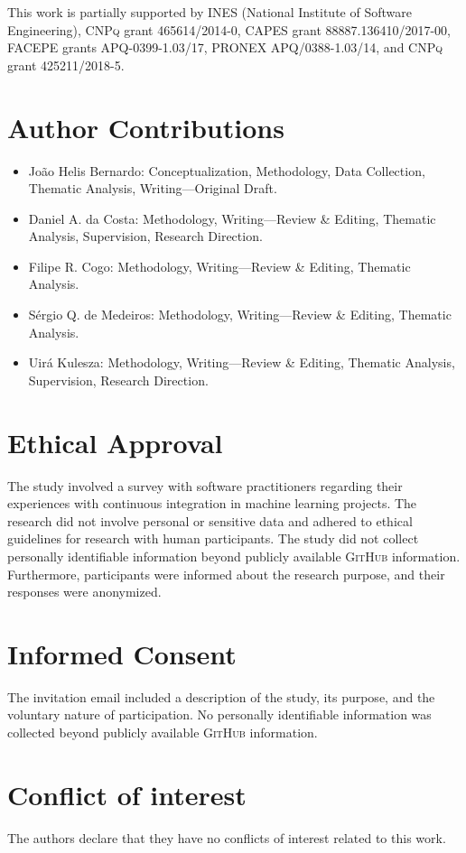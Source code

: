 This work is partially supported by \textsc{INES} (National Institute of Software Engineering), \textsc{CNPq} grant 465614/2014-0, \textsc{CAPES} grant 88887.136410/2017-00, \textsc{FACEPE} grants APQ-0399-1.03/17, \textsc{PRONEX} APQ/0388-1.03/14, and \textsc{CNPq} grant 425211/2018-5.

\section*{Author Contributions}

\begin{itemize}
    \item João Helis Bernardo: Conceptualization, Methodology, Data Collection, Thematic Analysis, Writing—Original Draft.
    \item Daniel A. da Costa: Methodology, Writing—Review \& Editing, Thematic Analysis, Supervision, Research Direction.
    \item Filipe R. Cogo: Methodology, Writing—Review \& Editing, Thematic Analysis.
    \item Sérgio Q. de Medeiros: Methodology, Writing—Review \& Editing, Thematic Analysis.
    \item Uirá Kulesza: Methodology, Writing—Review \& Editing, Thematic Analysis, Supervision, Research Direction.
\end{itemize}

\section*{Ethical Approval}

The study involved a survey with software practitioners regarding their experiences with continuous integration in machine learning projects. The research did not involve personal or sensitive data and adhered to ethical guidelines for research with human participants. 
The study did not collect personally identifiable information beyond publicly available \textsc{GitHub} information. Furthermore, participants were informed about the research purpose, and their responses were anonymized.

\section*{Informed Consent}

The invitation email included a description of the study, its purpose, and the voluntary nature of participation. No personally identifiable information was collected beyond publicly available \textsc{GitHub} information.

\section*{Conflict of interest}

The authors declare that they have no conflicts of interest related to this work.
